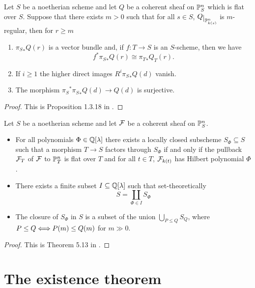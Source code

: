 \begin{proposition}\label{RegularityInFamilies}
Let $S$ be a noetherian scheme and let $Q$ be a coherent sheaf on $\mathbb{P}^n_S$ which is flat over $S$. Suppose that there exists $m>0$ such that for all $s\in S$, $Q\res{\Pj^n_{k(s)}}$ is $m$-regular, then for $r\geq m$
\begin{enumerate}
\item ${\pi_S}_\ast Q(r)$ is a vector bundle and, if $f:T\to S$ is an $S$-scheme, then we have
\[f^\ast{\pi_S}_\ast Q(r)\cong {\pi_T}_\ast Q_T(r).\]
\item If $i\geq 1$ the higher direct images $R^i{\pi_S}_\ast Q(d)$ vanish.
\item The morphism ${\pi_S}^\ast{\pi_S}_\ast Q(d)\to Q(d)$ is surjective.
\end{enumerate}
\end{proposition}
\begin{proof}
This is Proposition 1.3.18 in \cite{Alper}.
\end{proof}


\begin{theorem}\label{FlatetningStratifications}
Let $S$ be a noetherian scheme and let $\mathcal{F}$ be a coherent sheaf on $\mathbb{P}^n_S$. 
\begin{itemize}
\item For all polynomials $\Phi\in\mathbb{Q}[\lambda]$ there exists a locally closed subscheme $S_\Phi\subseteq S$ such that a morphism $T\to S$ factors through $S_\Phi$ if and only if the pullback $\mathcal{F}_T$ of $\mathcal{F}$ to $\mathbb{P}^n_T$ is flat over $T$ and for all $t\in T$, $\mathcal{F}_{k(t)}$ has Hilbert polynomial $\Phi$.
\item There exists a finite subset $I\subseteq \mathbb{Q}[\lambda]$ such that set-theoretically
\[S=\coprod_{\Phi\in I}S_\Phi\]
\item The closure of $S_\Phi$ in $S$ is a subset of the union $\bigcup_{P\leq Q}S_Q$, where $P\leq Q\Longleftrightarrow P(m)\leq Q(m)$ for $m\gg 0$.
\end{itemize}
\end{theorem}
\begin{proof}
This is Theorem 5.13 in \cite{FGAEXPLAINED}.
\end{proof}



\section{The existence theorem}

